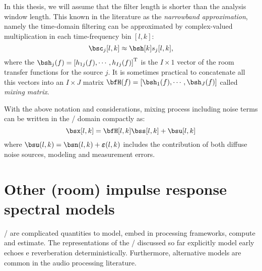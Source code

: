 In this thesis, we will assume that the filter length is shorter than the analysis window length.
This known in the literature as the \textit{narrowband approximation}, namely the time-domain filtering can be approximated by complex-valued multiplication in each time-frequency bin $[l,k]$:
\begin{equation}
    \imgs_j[l,k] \approx \bsh[k] \src_j[l,k]
    ,
\end{equation}
where the $\bsh_j(f) = \ktranspose{\klist{h_{1j}(f), \cdots, h_{Ij}(f)}}$ is the $I \times 1$ vector of the room transfer functions for the source $j$.
It is sometimes practical to concatenate all this vectors into an $I \times J$ matrix $\bfH(f) = \klist{\bsh_1(f),\cdots,\bsh_J(f)}$ called \textit{mixing matrix}.

With the above notation and considerations, mixing process including noise terms can be written in the \STFT/ domain compactly as:
\begin{equation}\label{eq:processing:model:stfs}
    \bsx[l,k] = \bfH[l,k] \bss[l,k] + \bsu[l,k]
\end{equation}
where $\bsu(l,k) = \bsn(l,k) + \boldsymbol{\varepsilon}(l,k)$ includes the contribution of both diffuse noise sources, modeling and measurement errors.



\section{Other (room) impulse response spectral models}\label{sec:processing:rirmodels}
\RIRs/ are complicated quantities to model, embed in processing frameworks, compute and estimate.
The representations of the \RIR/ discussed so far explicitly model early echoes e reverberation deterministically.
Furthermore, alternative models are common in the audio processing literature.

